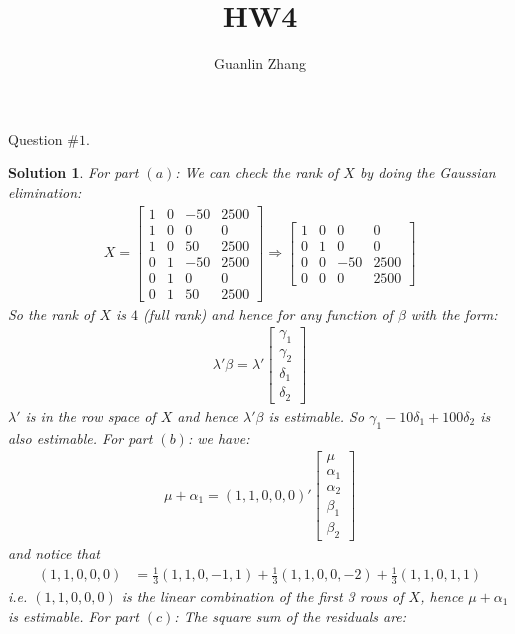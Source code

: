 \documentclass[11pt]{article}
\title{HW4}
\author{Guanlin Zhang}
\newtheorem{sol}{Solution}
\begin{document}
Question $\# 1$.
\begin{sol}
	For part $(a)$:\vskip 2mm
	We can check the rank of $X$ by doing the Gaussian elimination:
	\begin{align*}
		X = \left[\begin{array}{cccc} 1&0&-50&2500\\ 1&0&0&0\\ 1&0&50&2500\\ 0&1&-50&2500\\0 &1&0&0\\ 0&1&50&2500\end{array}\right]\Longrightarrow \left[\begin{array}{cccc}1 &0&0&0\\ 0&1&0&0\\ 0&0&-50&2500\\ 0&0&0&2500\end{array}\right]
	\end{align*}
	So the rank of $X$ is $4$ (full rank) and hence for any function of $\beta$ with the form:
	\begin{align*}
		\lambda'\beta = \lambda'\left[\begin{array}{c}\gamma_1\\ \gamma_2 \\ \delta_1\\ \delta_2 \end{array}\right]
	\end{align*}
  $\lambda'$ is in the row space of $X$ and hence $\lambda'\beta$ is estimable. So $\gamma_1 - 10\delta_1 + 100\delta_2$ is also estimable.\vskip 2mm
  For part $(b)$:\vskip 2mm
  we have:
  \begin{align*}
  	\mu + \alpha_1 = (1, 1, 0, 0, 0)'\left[\begin{array}{ccccc} \mu\\ \alpha_1\\ \alpha_2\\ \beta_1\\ \beta_2 \end{array}\right]
  \end{align*}
  and notice that
  \begin{align*}
  	(1, 1, 0, 0, 0)&= \frac{1}{3}(1,1, 0, -1, 1) + \frac{1}{3}(1, 1, 0, 0, -2) + \frac{1}{3}(1, 1, 0, 1, 1)
  \end{align*}
  i.e. $(1, 1, 0, 0, 0)$ is the linear combination of the first 3 rows of $X$, hence $\mu + \alpha_1$ is estimable.\vskip 2mm
  For part $(c)$:\vskip 2mm
  The square sum of the residuals are:
  \begin{align*}

\end{align*}
\end{sol}
\end{document}
